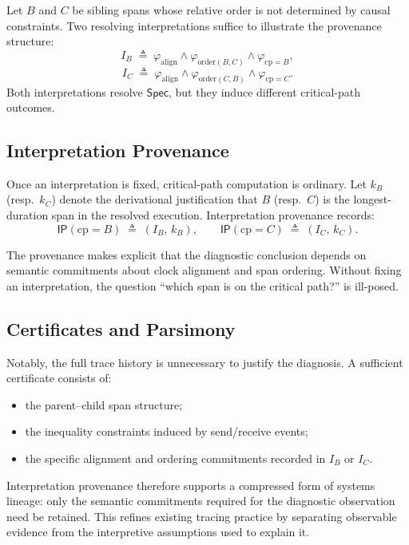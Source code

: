 \documentclass[acmsmall,nonacm]{acmart}
\theoremstyle{remark}
\numberwithin{definition}{section}
\numberwithin{theorem}{section}
\numberwithin{lemma}{section}
\numberwithin{corollary}{section}
\numberwithin{remark}{section}
\numberwithin{example}{section}
\numberwithin{observation}{section}
\numberwithin{assumption}{section}
\newcommand{\Spec}{\mathsf{Spec}}
\begin{document}
Let $B$ and $C$ be sibling spans whose relative order is not determined by causal
constraints.
Two resolving interpretations suffice to illustrate the provenance structure:
\[
  I_B \;\triangleq\;
  \varphi_{\mathrm{align}} \wedge \varphi_{\mathrm{order}(B,C)} \wedge
  \varphi_{\mathrm{cp}=B},
\]
\[
  I_C \;\triangleq\;
  \varphi_{\mathrm{align}} \wedge \varphi_{\mathrm{order}(C,B)} \wedge
  \varphi_{\mathrm{cp}=C}.
\]
Both interpretations resolve $\Spec$, but they induce different critical-path
outcomes.

\subsection{Interpretation Provenance}

Once an interpretation is fixed, critical-path computation is ordinary.
Let $k_B$ (resp.\ $k_C$) denote the derivational justification that $B$ (resp.\ $C$)
is the longest-duration span in the resolved execution.
Interpretation provenance records:
\[
  \mathsf{IP}(\mathrm{cp}=B) \;\triangleq\; (I_B,\, k_B),
  \qquad
  \mathsf{IP}(\mathrm{cp}=C) \;\triangleq\; (I_C,\, k_C) .
\]

The provenance makes explicit that the diagnostic conclusion depends on semantic
commitments about clock alignment and span ordering.
Without fixing an interpretation, the question ``which span is on the critical
path?'' is ill-posed.

\subsection{Certificates and Parsimony}

Notably, the full trace history is unnecessary to justify the diagnosis.
A sufficient certificate consists of:
\begin{itemize}
  \item the parent--child span structure;
  \item the inequality constraints induced by send/receive events;
  \item the specific alignment and ordering commitments recorded in $I_B$ or
        $I_C$.
\end{itemize}

Interpretation provenance therefore supports a compressed form of systems lineage:
only the semantic commitments required for the diagnostic observation need be
retained.
This refines existing tracing practice by separating observable evidence from the
interpretive assumptions used to explain it.
\end{document}

